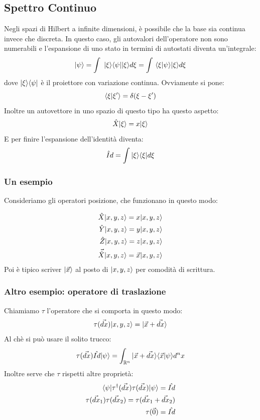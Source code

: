 \subsection{Spettro Continuo}
Negli spazi di Hilbert a infinite dimensioni, è possibile che la base sia continua invece che discreta. In questo caso, gli autovalori dell'operatore non sono numerabili e l'espansione di uno stato in termini di autostati diventa un'integrale:
\[
    |\psi\ket = \int \ \ketbra{\xi}{\psi} \Ket \xi d\xi = \int \ \bra \xi | \psi \ket |\xi \ket d\xi
\]
dove $\ketbra{\xi}{\psi}$ è il proiettore con variazione continua.
Ovviamente si pone:
\[
    \bra \xi | \xi' \ket = \delta(\xi - \xi')
\]
Inoltre un autovettore in uno spazio di questo tipo ha questo aspetto:
\[
    \hat X |\xi\ket = x |\xi\ket
\]
E per finire l'espansione dell'identità diventa:
\[
    \hat Id = \int |\xi\ket \bra \xi | d\xi
\]

\subsubsection*{Un esempio}
Consideriamo gli operatori posizione, che funzionano in questo modo:

\begin{align*}
    \hat{X} \vpos = x \vpos \\
    \hat{Y} \vpos = y \vpos \\
    \hat{Z} \vpos = z \vpos \\
    \vec{\hat{X}} \vpos = \vec x \vpos
\end{align*}
Poi è tipico scriver $\Ket {\vec x}$ al posto di $\vpos$ per comodità di scrittura.

\subsubsection*{Altro esempio: operatore di traslazione}
Chiamiamo $\tau$ l'operatore che si comporta in questo modo:
\[
    \tau (\vec {dx}) \vpos = \Ket {\vec x + \vec{dx}}
\]
Al chè si può usare il solito trucco:
\[
    \tau (\vec {dx}) \hat{Id} |\psi\ket = \rnint |\vec x + \vec {dx}\ket \bra \vec x | \psi\ket d^nx
\]
Inoltre serve che $\tau$ rispetti altre proprietà:
\begin{align*}
    \bra\psi|\tau^\dag (\vec{dx}) \tau(\vec{dx})|\psi\ket = \hat{Id} \\
    \tau(\vec{dx}_1) \tau(\vec{dx}_2) = \tau(\vec{dx}_1 + \vec{dx}_2) \\
    \tau(\vec{0}) = \hat{Id}
\end{align*}

